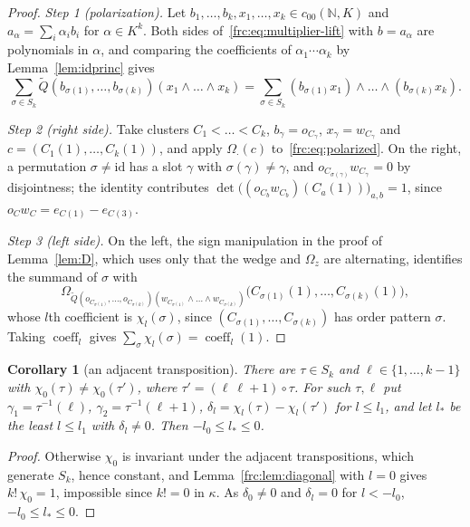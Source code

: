 \documentclass[11pt]{amsart}
\newtheorem{corollary}[theorem]{Corollary}
\theoremstyle{definition}
\theoremstyle{remark}
\numberwithin{equation}{section}
\newcommand{\N}{\mathbb N}
\newcommand{\id}{\mathrm{id}}
\newcommand{\coeff}{\operatorname{coeff}}
\theoremstyle{plain}
\theoremstyle{definition}
\theoremstyle{plain}
\begin{document}
\begin{proof}
\emph{Step 1 (polarization).} Let $b_1,\dots,b_k,x_1,\dots,x_k\in c_{00}(\N,K)$ and $a_\alpha=\sum_i\alpha_ib_i$ for
$\alpha\in K^k$. Both sides of~\eqref{frc:eq:multiplier-lift} with $b=a_\alpha$ are polynomials in $\alpha$, and
comparing the coefficients of $\alpha_1\cdots\alpha_k$ by Lemma~\ref{lem:idprinc} gives
\begin{equation}\label{frc:eq:polarized}
 \sum_{\sigma\in S_k}\widetilde Q(b_{\sigma(1)},\dots,b_{\sigma(k)})(x_1\wedge\dots\wedge x_k)
 =\sum_{\sigma\in S_k}(b_{\sigma(1)}x_1)\wedge\dots\wedge(b_{\sigma(k)}x_k).
\end{equation}

\emph{Step 2 (right side).} Take clusters $C_1<\dots<C_k$, $b_\gamma=o_{C_\gamma}$, $x_\gamma=w_{C_\gamma}$ and
$c=(C_1(1),\dots,C_k(1))$, and apply $\Omega_\cdot(c)$ to~\eqref{frc:eq:polarized}. On the right, a permutation
$\sigma\ne\id$ has a slot $\gamma$ with $\sigma(\gamma)\ne\gamma$, and $o_{C_{\sigma(\gamma)}}w_{C_\gamma}=0$ by
disjointness; the identity contributes $\det\bigl((o_{C_b}w_{C_b})(C_a(1))\bigr)_{a,b}=1$, since
$o_Cw_C=e_{C(1)}-e_{C(3)}$.

\emph{Step 3 (left side).} On the left, the sign manipulation in the proof of Lemma~\ref{lem:D}, which uses only that the
wedge and $\Omega_z$ are alternating, identifies the summand of $\sigma$ with
\[
 \Omega_{\widetilde Q(o_{C_{\sigma(1)}},\dots,o_{C_{\sigma(k)}})(w_{C_{\sigma(1)}}\wedge\dots\wedge w_{C_{\sigma(k)}})}
 \bigl(C_{\sigma(1)}(1),\dots,C_{\sigma(k)}(1)\bigr),
\]
whose $l$th coefficient is $\chi_l(\sigma)$, since $(C_{\sigma(1)},\dots,C_{\sigma(k)})$ has order pattern $\sigma$.
Taking $\coeff_l$ gives $\sum_\sigma\chi_l(\sigma)=\coeff_l(1)$.
\end{proof}

\begin{corollary}[an adjacent transposition]\label{frc:cor:transposition}
There are $\tau\in S_k$ and $\ell\in\{1,\dots,k-1\}$ with $\chi_0(\tau)\ne\chi_0(\tau')$, where $\tau'=(\ell\ \ell{+}1)\circ\tau$.
For such $\tau,\ell$ put $\gamma_1=\tau^{-1}(\ell)$, $\gamma_2=\tau^{-1}(\ell+1)$, $\delta_l=\chi_l(\tau)-\chi_l(\tau')$ for
$l\le l_1$, and let $l_*$ be the least $l\le l_1$ with $\delta_l\ne0$. Then $-l_0\le l_*\le0$.
\end{corollary}

\begin{proof}
Otherwise $\chi_0$ is invariant under the adjacent transpositions, which generate $S_k$, hence constant, and
Lemma~\ref{frc:lem:diagonal} with $l=0$ gives $k!\,\chi_0=1$, impossible since $k!=0$ in $\kappa$. As $\delta_0\ne0$ and
$\delta_l=0$ for $l<-l_0$, $-l_0\le l_*\le0$.
\end{proof}
\end{document}
